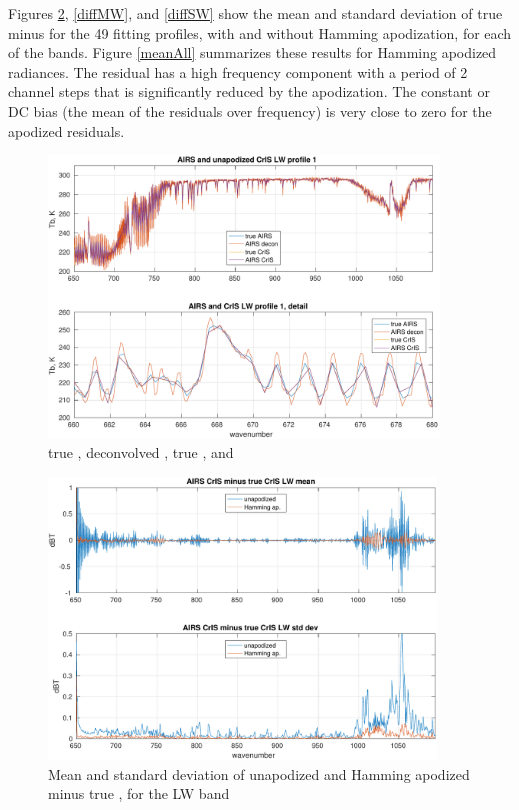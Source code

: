 \documentclass[11pt]{article}
\begin{document}
Figures \ref{diffLW}, \ref{diffMW}, and \ref{diffSW} show the mean
and standard deviation of true {\cris} minus {\airs} {\cris} for the
49 fitting profiles, with and without Hamming apodization, for each
of the {\cris} bands.  Figure \ref{meanAll} summarizes these results
for Hamming apodized radiances.  The residual has a high frequency
component with a period of 2 channel steps that is significantly
reduced by the apodization.  The constant or DC bias (the mean of
the residuals over frequency) is very close to zero for the apodized
residuals.


\begin{figure} %
  \centering
  \includegraphics[height=7.5cm]{figures/a2cris_spec_LW.pdf}
  \caption{true {\airs}, deconvolved {\airs}, true {\cris}, and
    {\airs} {\cris}}
  \label{specLW}
\end{figure}

\begin{figure} %
  \centering
  \includegraphics[height=7.5cm]{figures/a2cris_diff_LW.pdf}
  \caption{Mean and standard deviation of unapodized and Hamming
    apodized {\airs} {\cris} minus true {\cris}, for the {\cris} LW
    band}
  \label{diffLW}
\end{figure}
\end{document}
